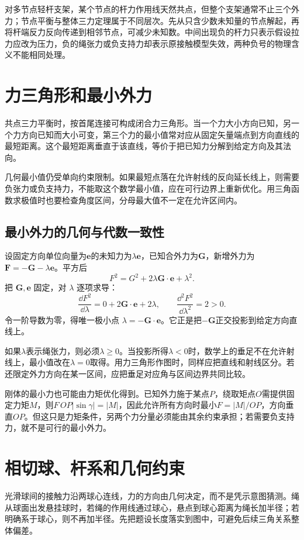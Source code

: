 对多节点轻杆支架，某个节点的杆力作用线天然共点，但整个支架通常不止三个外力；节点平衡与整体三力定理属于不同层次。先从只含少数未知量的节点解起，再将杆端反力反向传递到相邻节点，可减少未知数。中间出现负的杆力只表示假设拉力应改为压力，负的绳张力或负支持力却表示原接触模型失效，两种负号的物理含义不能相同处理。

\section{力三角形和最小外力}
共点三力平衡时，按首尾连接可构成闭合力三角形。当一个力大小方向已知，另一个力方向已知而大小可变，第三个力的最小值常对应从固定矢量端点到方向直线的最短距离。这个最短距离垂直于该直线，等价于把已知力分解到给定方向及其法向。

几何最小值仍受单向约束限制。如果最短点落在允许射线的反向延长线上，则需要负张力或负支持力，不能取这个数学最小值，应在可行边界上重新优化。用三角函数求极值时也要检查角度区间，分母最大值不一定在允许区间内。



\subsection{最小外力的几何与代数一致性}
设固定方向单位向量为$\boldsymbol e$的未知力为$\lambda\boldsymbol e$，已知合外力为$\boldsymbol G$，新增外力为$\boldsymbol F=-\boldsymbol G-\lambda\boldsymbol e$。平方后
\[
F^2=G^2+2\lambda\boldsymbol G\cdot\boldsymbol e+\lambda^2.
\]
把 $\boldsymbol G,\boldsymbol e$ 固定，对 $\lambda$ 逐项求导：
\[
\frac{\dd F^2}{\dd\lambda}
=0+2\boldsymbol G\cdot\boldsymbol e+2\lambda,\qquad
\frac{\dd^2F^2}{\dd\lambda^2}=2>0.
\]
令一阶导数为零，得唯一极小点 $\lambda=-\boldsymbol G\cdot\boldsymbol e$。它正是把$-\boldsymbol G$正交投影到给定方向直线上。

如果$\lambda$表示绳张力，则必须$\lambda\ge0$。当投影所得$\lambda<0$时，数学上的垂足不在允许射线上，最小值改在$\lambda=0$取得。用力三角形作图时，同样应把直线和射线区分。若还限定外力方向在某一区间，应把垂足对应角与区间边界共同比较。

刚体的最小力也可能由力矩优化得到。已知外力施于某点$P$，绕取矩点$O$需提供固定力矩$M$，则$F\,OP|\sin\gamma|=|M|$，因此允许所有方向时最小$F=|M|/OP$，方向垂直$OP$。但这只是力矩条件，另两个力分量必须能由其余约束承担；若需要负支持力，就不是可行的最小外力。


\section{相切球、杆系和几何约束}
光滑球间的接触力沿两球心连线，力的方向由几何决定，而不是凭示意图猜测。绳从球面出发悬挂球时，若绳的作用线通过球心，悬点到球心距离为绳长加半径；若明确系于球心，则不再加半径。先把题设长度落实到图中，可避免后续三角关系整体偏差。

